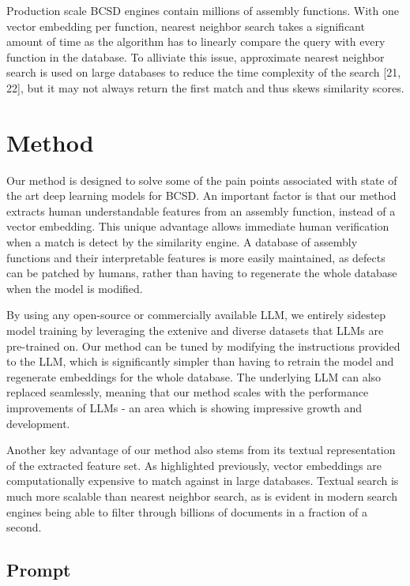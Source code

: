 \documentclass[conference,compsoc]{IEEEtran}
\begin{document}
Production scale BCSD engines contain millions of assembly functions. With one vector embedding per function, nearest neighbor
search takes a significant amount of time as the algorithm has to linearly compare the query with every function in the database.
To alliviate this issue, approximate nearest neighbor search is used on large databases to reduce the time complexity of the
search [21, 22], but it may not always return the first match and thus skews similarity scores.

\section{Method}

Our method is designed to solve some of the pain points associated with state of the art deep learning models for BCSD.
An important factor is that our method extracts human understandable features from an assembly function, instead
of a vector embedding. This unique advantage allows immediate human verification when a match is detect by the similarity
engine. A database of assembly functions and their interpretable features is more easily maintained, as defects can
be patched by humans, rather than having to regenerate the whole database when the model is modified.

By using any open-source or commercially available LLM, we entirely sidestep model training by leveraging the extenive
and diverse datasets that LLMs are pre-trained on.  Our method can be tuned by modifying the instructions provided to
the LLM, which is significantly simpler than having to retrain the model and regenerate embeddings for the whole database.
The underlying LLM can also replaced seamlessly, meaning that our method scales with the performance improvements
of LLMs - an area which is showing impressive growth and development.

Another key advantage of our method also stems from its textual representation of the extracted feature set. As highlighted
previously, vector embeddings are computationally expensive to match against in large databases. Textual search is much
more scalable than nearest neighbor search, as is evident in modern search engines being able to filter through billions of documents
in a fraction of a second.


\subsection{Prompt}
\end{document}
